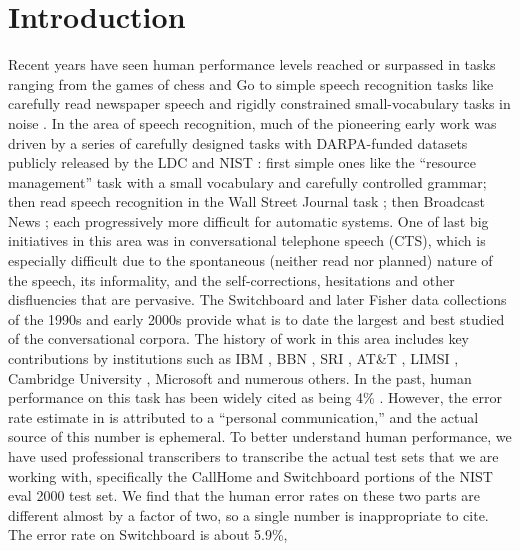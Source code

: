 \documentclass{article}
\begin{document}
\section{Introduction}
\label{sec:intro}
Recent years have seen human performance levels reached or surpassed in 
tasks ranging from the games of chess and Go 
\cite{campbell2002deep,silver2016mastering} 
to simple speech recognition 
tasks like carefully read newspaper 
speech \cite{amodei2015deep} and rigidly constrained small-vocabulary tasks in noise \cite{kristjansson2006super,weng2014single}. In the area of 
speech recognition, much of the
pioneering early work was driven by a series of carefully designed 
tasks with DARPA-funded 
datasets publicly released 
by the LDC and NIST \cite{pallett2003look}: first simple ones like 
the ``resource management'' task \cite{price1988darpa} with a small vocabulary and carefully
controlled grammar; then read speech recognition in the Wall Street 
Journal task \cite{paul1992design}; then Broadcast News \cite{graff19971996}; each progressively
more difficult for automatic systems. One of last big initiatives in this area was
in conversational telephone speech (CTS), which is especially difficult due to the
spontaneous (neither read nor planned) nature of the speech, its informality,
and the self-corrections, hesitations and other disfluencies that are pervasive.
The Switchboard \cite{godfrey1992switchboard} and later Fisher \cite{cieri2004fisher} data collections of the 1990s and early 2000s provide what is to date 
the largest and best studied of the conversational corpora.
The history of work in this area includes key contributions by institutions
such as IBM \cite{chen2006advances}, BBN \cite{matsoukas2006advances},
SRI \cite{stolcke2006recent}, AT\&T \cite{ljolje2001}, LIMSI \cite{gauvain2003conversational}, Cambridge University \cite{evermann2004development},
Microsoft \cite{seide2011conversational}
and numerous others. 
In the past, human performance on this task has been widely cited as
being 4\% \cite{lippmann1997speech}. However, the error rate estimate 
in \cite{lippmann1997speech} is
attributed to a ``personal communication,'' and the actual source of this
number is ephemeral. To better understand human performance, 
we have used professional transcribers to transcribe 
the actual test sets that we are working with,
specifically the CallHome and Switchboard portions of the NIST eval 2000
test set. We find that the human error rates on these two parts are 
different almost by a factor of two, so a single number is 
inappropriate to cite. The error rate on Switchboard is about  5.9\%,
\end{document}

